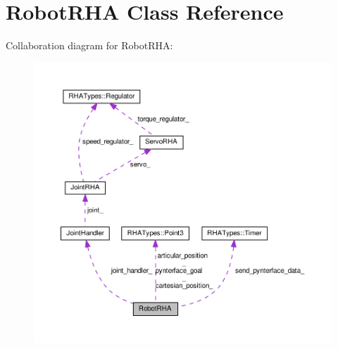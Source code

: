 \hypertarget{classRobotRHA}{}\section{Robot\+R\+HA Class Reference}
\label{classRobotRHA}


Collaboration diagram for Robot\+R\+HA\+:
\nopagebreak
\begin{figure}[H]
\begin{center}
\leavevmode
\includegraphics[width=350pt]{classRobotRHA__coll__graph}
\end{center}
\end{figure}
